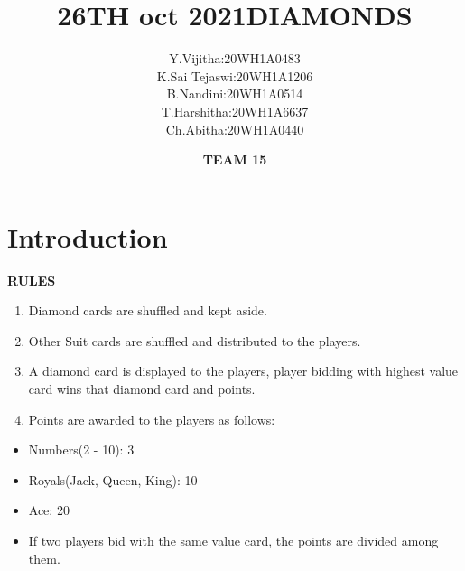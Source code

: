 \documentclass[12pt]{beamer}
\title{\textbf{26TH oct 2021}}
\title{\textbf{DIAMONDS}}
\author[Bvrith]{Y.Vijitha:20WH1A0483 \\K.Sai Tejaswi:20WH1A1206\\ B.Nandini:20WH1A0514\\ T.Harshitha:20WH1A6637\\ Ch.Abitha:20WH1A0440}
\date{\textbf{TEAM 15}}
\begin{document}
\maketitle

\section{Introduction}


\begin{frame}{\LARGE{\textbf{RULES}}}
        \begin{enumerate}[label = \arabic*)]
	    \item Diamond cards are shuffled and kept aside.
        \item Other Suit cards are shuffled and distributed to the players.
        \item A diamond card is displayed to the players, player bidding with highest value card wins that diamond card and points.
        \item Points are awarded to the players as follows:
        \end{enumerate}
        \begin{itemize}
                \item Numbers(2 - 10): 3
                \item Royals(Jack, Queen, King): 10
                \item Ace: 20
                \item If two players bid with the same value card, the points are divided among them.
        \end{itemize}
\end{frame}
\end{document}
